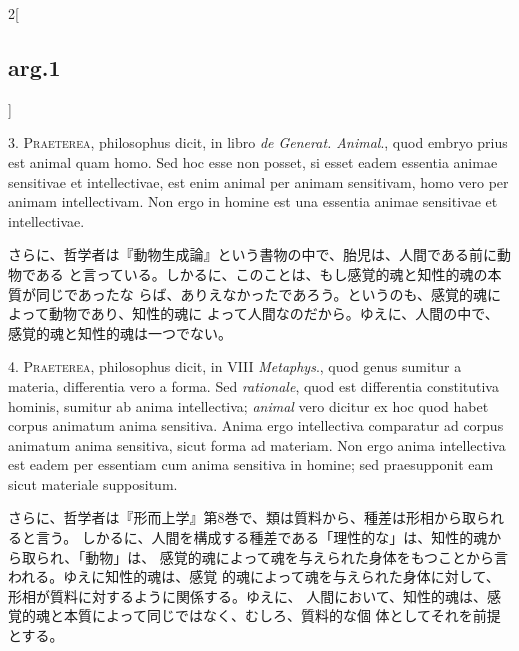 \documentclass[paper=a4paper,fontsize=10pt,jafontsize=9pt,titlepage]{jlreq}
\begin{document}
\begin{paracol}{2}[\subsection{arg.1}]



3. {\scshape Praeterea}, philosophus dicit, in libro {\itshape de
Generat. Animal}., quod embryo prius est animal quam homo. Sed hoc esse non
posset, si esset eadem essentia animae sensitivae et intellectivae, est enim
animal per animam sensitivam, homo vero per animam intellectivam. Non ergo in
homine est una essentia animae sensitivae et intellectivae.

\switchcolumn

さらに、哲学者は『動物生成論』という書物の中で、胎児は、人間である前に動物である
と言っている。しかるに、このことは、もし感覚的魂と知性的魂の本質が同じであったな
らば、ありえなかったであろう。というのも、感覚的魂によって動物であり、知性的魂に
よって人間なのだから。ゆえに、人間の中で、感覚的魂と知性的魂は一つでない。
 

4. {\scshape Praeterea}, philosophus dicit, in VIII {\itshape Metaphys}., quod
genus sumitur a materia, differentia vero a forma. Sed {\itshape rationale},
quod est differentia constitutiva hominis, sumitur ab anima intellectiva;
{\itshape animal} vero dicitur ex hoc quod habet corpus animatum anima
sensitiva. Anima ergo intellectiva comparatur ad corpus animatum anima
sensitiva, sicut forma ad materiam. Non ergo anima intellectiva est eadem per
essentiam cum anima sensitiva in homine; sed praesupponit eam sicut materiale
suppositum.

\switchcolumn

さらに、哲学者は『形而上学』第8巻で、類は質料から、種差は形相から取られると言う。
しかるに、人間を構成する種差である「理性的な」は、知性的魂から取られ、「動物」は、
感覚的魂によって魂を与えられた身体をもつことから言われる。ゆえに知性的魂は、感覚
的魂によって魂を与えられた身体に対して、形相が質料に対するように関係する。ゆえに、
人間において、知性的魂は、感覚的魂と本質によって同じではなく、むしろ、質料的な個
体としてそれを前提とする。
 
\switchcolumn*[\subsection{s.c.}]


\end{paracol}
\end{document}

